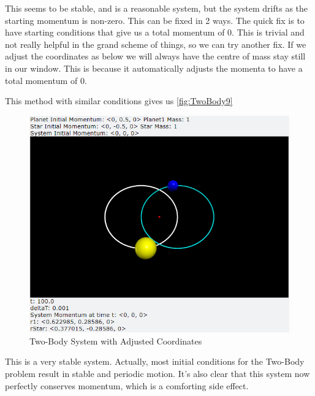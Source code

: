 \documentclass[12pt]{article}
\begin{document}
\begin{enumerate}
        \newline
        This seems to be stable, and is a reasonable system, but the system drifts as the starting momentum 
        is non-zero. This can be fixed in 2 ways. The quick fix is to have starting conditions that give us 
        a total momentum of 0. This is trivial and not really helpful in the grand scheme of things, so we 
        can try another fix. If we adjust the coordinates as below we will always have the centre of mass 
        stay still in our window. This is because it automatically adjusts the momenta to have a total 
        momentum of 0.
        
        This method with similar conditions gives us \autoref{fig:TwoBody9}
        \begin{figure}[H]
            \begin{center}
               \includegraphics[scale=.5]{TwoBody9.png}
               \caption{Two-Body System with Adjusted Coordinates}
               \label{fig:TwoBody9}
            \end{center}
        \end{figure}
        \noindent
        This is a very stable system. Actually, most initial conditions for the Two-Body problem result in 
        stable and periodic motion. It's also clear that this system now perfectly conserves momentum, which 
        is a comforting side effect.
        \newpage


    \end{enumerate}
\end{document}
